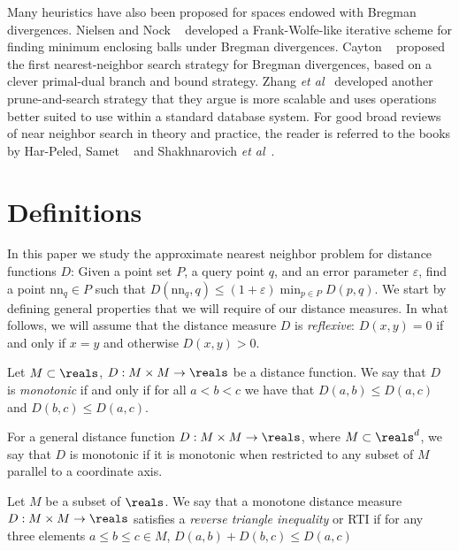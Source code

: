 \documentclass[11pt]{myclass}
\newcommand{\eps}{\varepsilon}
\newcommand{\etal}{\emph{et al}\xspace}
\begin{document}
Many heuristics have also been proposed for spaces endowed with Bregman divergences. Nielsen and Nock ~\cite{nsmallestdisk} developed a Frank-Wolfe-like iterative scheme for finding minimum enclosing balls under Bregman divergences. Cayton ~\cite{caytonpaper} proposed the first nearest-neighbor search strategy for Bregman divergences, based on a clever primal-dual branch and bound strategy. Zhang \etal ~\cite{bregsearch} developed another prune-and-search strategy that they argue is more scalable and uses operations better suited to use within a standard database system. 
For good broad reviews of near neighbor search in theory and practice, the reader is referred to the books by Har-Peled\cite{snotes}, Samet ~\cite{samet} and Shakhnarovich \etal ~\cite{nnbook}.


 
\section{Definitions}
\label{sec:defn}


In this paper we study the approximate nearest neighbor problem for distance functions $D$:  Given a point set $P$, a query point $q$, and an error parameter $\eps$, find a point $\text{nn}_q \in P$ such that $D(\text{nn}_q,q) \leq (1 + \eps)\min_{p \in P} D(p,q)$. 
We start by defining general properties that we will require of our distance measures. In what follows, we will assume that the distance measure $D$ is \emph{reflexive}: $D(x,y) = 0$ if and only if $x = y$ and otherwise $D(x,y) > 0$. 

\begin{defn}[Monotonicity]\label{monotonedefn}
Let $M\subset \reals$, $D:M\times M\to\reals$ be a distance function. We say that $D$ is \emph{monotonic} if and only if for all $a<b<c$
we have that $D(a,b) \leq D(a,c)$ and $D(b,c) \leq D(a,c)$.
\end{defn}


For a general distance function $D : M \times M \to \reals$, where $M \subset \reals^d$, we say that $D$ is monotonic if it is monotonic when restricted to any subset of $M$ parallel to a coordinate axis. 

\begin{defn}
Let $M$ be a subset of $\reals$.  We say that a monotone distance measure $D : M \times M \to \reals$ satisfies a \emph{reverse triangle inequality} or RTI if for any three elements $a \le b \le c \in M$, 
$ D(a,b) + D(b,c) \le D(a,c) $
\end{defn}
\end{document}
